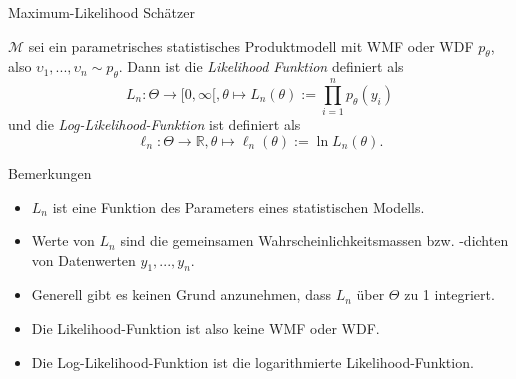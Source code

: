 \documentclass[
  8pt,
  ignorenonframetext,
]{beamer}
\providecommand{\tightlist}{%
  \setlength{\itemsep}{0pt}\setlength{\parskip}{0pt}}
\newcommand{\ups} {\upsilon}
\begin{document}
\begin{frame}{Maximum-Likelihood Schätzer}
\protect\hypertarget{maximum-likelihood-schuxe4tzer}{}
\small
\begin{definition}
\justifying
$\mathcal{M}$ sei ein parametrisches statistisches Produktmodell mit WMF oder WDF $p_\theta$,
also $\ups_1,...,\ups_n \sim p_\theta$. Dann ist die \textit{Likelihood Funktion} definiert als
\begin{equation}
L_n : \Theta \to [0,\infty[, \theta \mapsto L_n(\theta) := \prod_{i=1}^n p_\theta(y_i)
\end{equation}
und die \textit{Log-Likelihood-Funktion} ist definiert als
\begin{equation}
\mathcal{\ell}_n : \Theta \to \mathbb{R}, \theta \mapsto \ell_n(\theta) := \ln L_n(\theta).
\end{equation}
\end{definition}

\footnotesize

Bemerkungen

\begin{itemize}
\tightlist
\item
  \(L_n\) ist eine Funktion des Parameters eines statistischen Modells.
\item
  Werte von \(L_n\) sind die gemeinsamen Wahrscheinlichkeitsmassen bzw.
  -dichten von Datenwerten \(y_1,...,y_n\).
\item
  Generell gibt es keinen Grund anzunehmen, dass \(L_n\) über \(\Theta\)
  zu 1 integriert.
\item
  Die Likelihood-Funktion ist also keine WMF oder WDF.
\item
  Die Log-Likelihood-Funktion ist die logarithmierte
  Likelihood-Funktion.
\end{itemize}
\end{frame}
\end{document}
